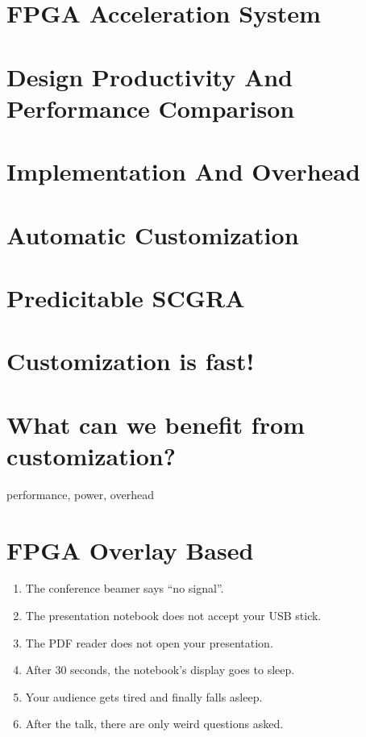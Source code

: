 \documentclass[
	paper=128mm:96mm,	%
	fontsize=11pt,					%
	pagesize,							%
	parskip=half-,					%
	numbers=noendperiod,	%
	captions=nooneline			%
	]{scrartcl}							%
\newcommand*{\mygreen}[1]{\textcolor{mygreen}{#1}}
\newcommand*{\mybrown}[1]{\textcolor{mybrown}{#1}}
\newcommand*{\myred}[1]{\textcolor{myred}{#1}}
\theoremstyle{mythmstyle}
\begin{document}
	
\clearpage

\section{FPGA Acceleration System}

\clearpage

\section{Design Productivity And Performance Comparison}
\clearpage

\section{Implementation And Overhead}
\clearpage

\section{Automatic Customization}
\clearpage

\section{Predicitable SCGRA}
\clearpage

\section{Customization is fast!}
\clearpage

\section{What can we benefit from customization?}
performance, power, overhead
\clearpage

%
%
\section{FPGA Overlay Based }
\begin{enumerate}
	\item The conference beamer says \myred{``no signal''}.
	\item The presentation notebook does \myred{not accept} your USB stick.
	\item The PDF reader does \myred{not open} your presentation. 
	\item After 30 seconds, the notebook's \mybrown{display goes to sleep}. 
	\item Your audience gets tired and finally falls \mybrown{asleep}.
	\item After the talk, there are only \mygreen{weird questions} asked.
\end{enumerate}	
\clearpage
%
%
\end{document}
